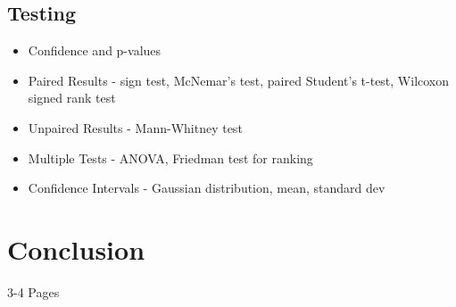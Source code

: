 \documentclass[\myFontSize,oneside,english,hidelinks,a4paper]{article}
\begin{document}
\subsection{Testing}
\cite{Gunawardana2022547}
%
\begin{itemize}
\item Confidence and p-values
\item Paired Results - sign test, McNemar's test, paired Student's t-test, Wilcoxon signed rank test
\item Unpaired Results - Mann-Whitney test
\item Multiple Tests - ANOVA, Friedman test for ranking
\item Confidence Intervals - Gaussian distribution, mean, standard dev
\end{itemize}
%


\clearpage{}
\section{Conclusion}
3-4 Pages\\\\



\clearpage
\thispagestyle{empty}
\mbox{}







\clearpage 
\normalsize 
 
 
\nocite{*}
\end{document}
